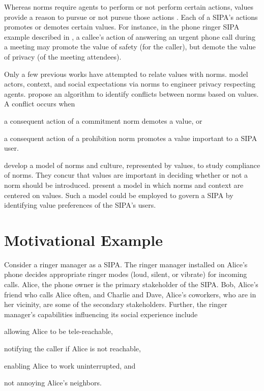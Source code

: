 Whereas norms require agents to perform or not perform certain actions, values provide a reason to pursue or not pursue those actions \citep{Dechesne-AIL13-Norms+Values}. 
Each of a SIPA's actions promotes or demotes certain values. 
For instance, in the phone ringer SIPA example described in \citet{Ajmeri-AAMAS17-Arnor}, a callee's action of answering an urgent phone call during a meeting may promote the value of safety (for the caller), but demote the value of privacy (of the meeting attendees).

Only a few previous works have attempted to relate values with norms.
\citet{Murukannaiah-IC16-Engineering} model actors, context, and social expectations via norms to engineer privacy respecting agents. 
\citet{DaSilvaFigueiredo-COIN13} propose an algorithm to identify conflicts between norms based on values. 
A conflict occurs when
\begin{enumerate*}[label=(\arabic*)]
\item a consequent action of a commitment norm demotes a value, or
\item a consequent action of a prohibition norm promotes a value important to a SIPA user.
\end{enumerate*}
%
\citet{Dechesne-AIL13-Norms+Values} develop a model of norms and culture,
represented by values, to study compliance of norms. They concur that
values are important in deciding whether or not a norm should be
introduced. \citet{kayal13coin} present a model in which norms and 
context are centered on values. Such a model could be employed
to govern a SIPA by identifying value preferences of the SIPA's
users.


\section{Motivational Example}
\begin{example}
\label{ex:intro-ringer-meeting} 
Consider a ringer manager as a SIPA. The ringer manager installed on 
Alice's phone decides appropriate ringer modes (loud, silent, or 
vibrate) for incoming calls. Alice, the phone owner is the 
primary stakeholder of the SIPA. Bob, Alice's friend who 
calls Alice often, and Charlie and Dave, Alice's coworkers, who are in 
her vicinity, are some of the secondary stakeholders. Further, the ringer 
manager's capabilities influencing its social experience include
\begin{enumerate*}[label=(\arabic*)]
\item allowing Alice to be tele-reachable, 
\item notifying the caller if Alice is not reachable,
\item enabling Alice to work uninterrupted, and
\item not annoying Alice's neighbors.
\end{enumerate*}
\end{example}

